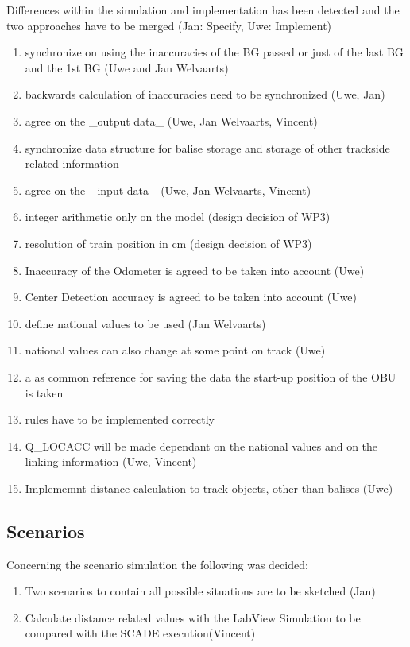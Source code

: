 \documentclass{article}
\begin{document}
Differences within the simulation and implementation has been detected
and the two approaches have to be merged (Jan: Specify, Uwe: Implement)
\begin{enumerate}
\item synchronize on using the inaccuracies of the BG passed or just of the last BG and the 1st BG (Uwe and Jan Welvaarts)
\item backwards calculation of inaccuracies need to be synchronized (Uwe, Jan)
\item agree on the _output data_ (Uwe, Jan Welvaarts, Vincent)
\item synchronize data structure for balise storage and storage of other trackside related information
\item agree on the _input data_ (Uwe, Jan Welvaarts, Vincent)
\item integer arithmetic only on the model (design decision of WP3)
\item  resolution of train position in cm (design decision of WP3)
\item  Inaccuracy of the Odometer is agreed to be taken into account (Uwe)
\item  Center Detection accuracy is agreed to be taken into account (Uwe)
\item  define national values to be used (Jan Welvaarts)
\item  national values can also change at some point on track (Uwe)
\item  a as common reference for saving the data the start-up position of the OBU is taken
\item rules have to be implemented correctly
\item  Q_LOCACC will be made dependant on the national values and on the linking information (Uwe, Vincent)
\item  Implememnt distance calculation to track objects, other than balises (Uwe)
\end{enumerate}

\subsection{Scenarios}
Concerning the scenario simulation the following was decided:
\begin{enumerate}
\item Two scenarios to contain all possible situations are to be sketched (Jan)
\item Calculate distance related values with the LabView Simulation to be compared with the SCADE execution(Vincent)
\end{enumerate}
\end{document}
